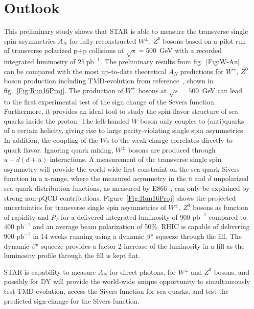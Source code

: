 \documentclass{PoS}
\begin{document}
\section{Outlook}
This preliminary study shows that STAR is able to measure the transverse single spin asymmetries $A_{N}$ for fully reconstructed $W^{\pm}$, $Z^{0}$ bosons based on a pilot run of transverse polarized p+p collisions at $\sqrt{s}=500$~GeV with a recorded integrated luminosity of $25~\text{pb}^{-1}$. 
The preliminary results from fig.~\ref{Fig:W-An} can be compared with the most up-to-date theoretical $A_{N}$ predictions for $W^{\pm}$, $Z^{0}$ boson production including TMD-evolution from reference~\cite{Kang:2014}, shown in fig.~\ref{Fig:Run16Proj}.
The production of $W^{\pm}$ bosons at $\sqrt{s}=500$~GeV can lead to the first experimental test of the sign change of the Severs function. Furthermore, it provides an ideal tool to study the spin-flavor structure of sea quarks inside the proton. The left-handed $W$ boson only couples to (anti)quarks of a certain helicity, giving rise to large parity-violating single spin asymmetries. In addition, the coupling of the $W$s to the weak charge correlates directly to quark flavor. Ignoring quark mixing, $W^{\pm}$ bosons are produced through $u+\bar d (d + \bar u)$ interactions. A measurement of the transverse single spin asymmetry will provide the world wide first constraint on the sea quark Sivers function in a x-range, where the measured asymmetry in the  $\bar u$ and $\bar d$ unpolarized sea quark distribution functions, as measured by E866~\cite{E866}, can only be explained by strong non-pQCD contributions. Figure~\ref{Fig:Run16Proj} shows the projected uncertainties for transverse single spin asymmetries of $W^{\pm}$, $Z^{0}$ bosons as function of rapidity and $P_{T}$ for a delivered integrated luminosity of 900 $\text{pb}^{-1}$ compared to 400 $\text{pb}^{-1}$  and an average beam polarization of 50\%. RHIC is capable of delivering 900 $\text{pb}^{-1}$ in 14 weeks running using a dynamic $\beta$* squeeze through the fill. The dynamic $\beta$* squeeze provides a factor 2 increase of the luminosity in a fill as the luminosity profile through the fill is kept flat.

STAR is capability to measure $A_{N}$ for direct photons, for $W^{\pm}$ and $Z^{0}$ bosons, and possibly for DY will provide the world-wide unique opportunity to simultaneously test TMD evolution, access the Sivers function for sea quarks, and test the predicted sign-change for the Sivers function.
\end{document}
